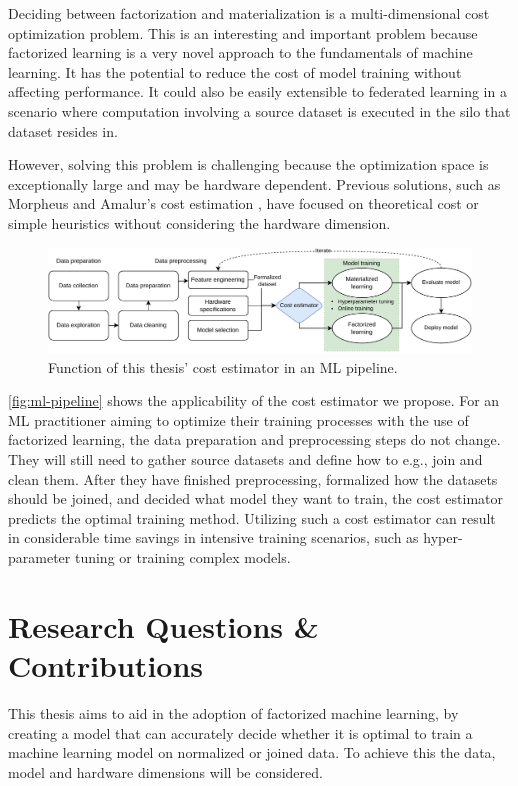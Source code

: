 Deciding between factorization and materialization is a multi-dimensional cost optimization problem. This is an interesting and important problem because factorized learning is a very novel approach to the fundamentals of machine learning. It has the potential to reduce the cost of model training without affecting performance. It could also be easily extensible to federated learning in a scenario where computation involving a source dataset is executed in the silo that dataset resides in.

However, solving this problem is challenging because the optimization space is exceptionally large and may be hardware dependent. Previous solutions, such as Morpheus \cite{morpheus} and Amalur's cost estimation \cite{schijndel_cost_estimation}, have focused on theoretical cost or simple heuristics without considering the hardware dimension.

\begin{figure}[h]
    \centering
    \includegraphics[width=0.95\linewidth]{chapters/01_introduction/figures/ML-Pipeline.pdf}
    \caption{Function of this thesis' cost estimator in an ML pipeline.}
    \label{fig:ml-pipeline}
\end{figure}

\autoref{fig:ml-pipeline} shows the applicability of the cost estimator we propose. For an ML practitioner aiming to optimize their training processes with the use of factorized learning, the data preparation and preprocessing steps do not change. They will still need to gather source datasets and define how to e.g., join and clean them. After they have finished preprocessing, formalized how the datasets should be joined, and decided what model they want to train, the cost estimator predicts the optimal training method. Utilizing such a cost estimator can result in considerable time savings in intensive training scenarios, such as hyper-parameter tuning or training complex models.


\section{Research Questions \& Contributions}
This thesis aims to aid in the adoption of factorized machine learning, by creating a model that can accurately decide whether it is optimal to train a machine learning model on normalized or joined data. To achieve this the data, model and hardware dimensions will be considered. 

